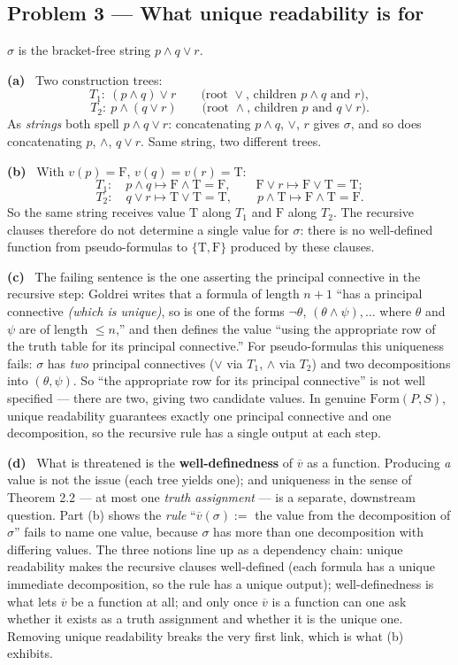 \documentclass[11pt]{article}
\newcommand{\Form}{\mathrm{Form}}
\newcommand{\T}{\mathrm{T}}
\newcommand{\F}{\mathrm{F}}
\newcommand{\TF}{\{\T,\F\}}
\newcommand{\ext}[1]{\overline{#1}}
\newcommand{\solpart}[1]{\smallskip\noindent\textbf{(#1)}\ }
\newcommand{\prob}[2]{\subsection*{Problem #1 --- #2}}
\begin{document}
\prob{3}{What unique readability is for}

$\sigma$ is the bracket-free string $p\land q\lor r$.

\solpart{a} Two construction trees:
\[
T_1:\ (p\land q)\lor r
\qquad\text{(root }\lor\text{, children }p\land q\text{ and }r),
\]
\[
T_2:\ p\land(q\lor r)
\qquad\text{(root }\land\text{, children }p\text{ and }q\lor r).
\]
As \emph{strings} both spell $p\land q\lor r$: concatenating $p\land q$, $\lor$,
$r$ gives $\sigma$, and so does concatenating $p$, $\land$, $q\lor r$. Same string,
two different trees.

\solpart{b} With $v(p)=\F$, $v(q)=v(r)=\T$:
\[
T_1:\quad p\land q\mapsto \F\land\T=\F,\qquad \F\lor r\mapsto \F\lor\T=\T;
\]
\[
T_2:\quad q\lor r\mapsto \T\lor\T=\T,\qquad p\land\T\mapsto \F\land\T=\F.
\]
So the same string receives value $\T$ along $T_1$ and $\F$ along $T_2$. The
recursive clauses therefore do not determine a single value for $\sigma$: there is
no well-defined function from pseudo-formulas to $\TF$ produced by these clauses.

\solpart{c} The failing sentence is the one asserting the principal connective in
the recursive step: Goldrei writes that a formula of length $n+1$ ``has a principal
connective \emph{(which is unique)}, so is one of the forms $\lnot\theta$,
$(\theta\land\psi),\dots$ where $\theta$ and $\psi$ are of length $\le n$,'' and
then defines the value ``using the appropriate row of the truth table for its
principal connective.'' For pseudo-formulas this uniqueness fails: $\sigma$ has
\emph{two} principal connectives ($\lor$ via $T_1$, $\land$ via $T_2$) and two
decompositions into $(\theta,\psi)$. So ``the appropriate row for its principal
connective'' is not well specified --- there are two, giving two candidate values.
In genuine $\Form(P,S)$, unique readability guarantees exactly one principal
connective and one decomposition, so the recursive rule has a single output at
each step.

\solpart{d} What is threatened is the \textbf{well-definedness} of $\ext{v}$ as a
function. Producing \emph{a} value is not the issue (each tree yields one); and
uniqueness in the sense of Theorem 2.2 --- at most one \emph{truth assignment} ---
is a separate, downstream question. Part (b) shows the \emph{rule}
``$\ext{v}(\sigma):=$ the value from the decomposition of $\sigma$'' fails to
name one value, because $\sigma$ has more than one decomposition with differing
values. The three notions line up as a dependency chain: unique readability makes
the recursive clauses well-defined (each formula has a unique immediate
decomposition, so the rule has a unique output); well-definedness is what lets
$\ext{v}$ be a function at all; and only once $\ext{v}$ is a function can one ask
whether it exists as a truth assignment and whether it is the unique one. Removing
unique readability breaks the very first link, which is what (b) exhibits.
\end{document}
